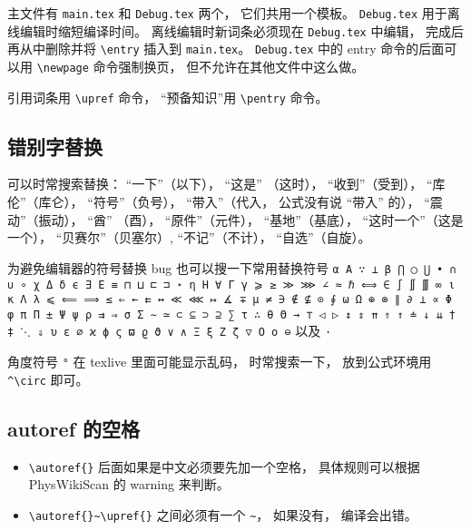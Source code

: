 主文件有 \verb|main.tex| 和 \verb|Debug.tex| 两个， 它们共用一个模板。 \verb|Debug.tex| 用于离线编辑时缩短编译时间。 离线编辑时新词条必须现在 \verb|Debug.tex| 中编辑， 完成后再从中删除并将 \verb|\entry| 插入到 \verb|main.tex|。 \verb|Debug.tex| 中的 entry 命令的后面可以用 \verb|\newpage| 命令强制换页， 但不允许在其他文件中这么做。

引用词条用 \verb|\upref| 命令， “预备知识”用 \verb|\pentry| 命令。

\subsection{错别字替换}
可以时常搜索替换： “一下”（以下）， “这是” （这时）， “收到”（受到）， “库伦”（库仑）， “符号”（负号）， “带入”（代入， 公式没有说 “带入” 的）， “震动”（振动）， “酋” （酉）， “原件”（元件）， “基地”（基底）， “这时一个”（这是一个）， “贝赛尔”（贝塞尔）, “不记”（不计）， “自选”（自旋）。

为避免编辑器的符号替换 bug 也可以搜一下常用替换符号 \verb|α Α ∵ ⊥ β ⋂ ◯ ⋃ • ∩ ∪ ∘ χ Δ δ ϵ ∃ Ε ≡ ⊓ ⊔ ⊏ ⊐ ⋆ η Η ∀ Γ γ ⩾ ≥ ≫ ⋙ ∠ ≈ ℏ ⟺ ∈ ∫ ∬ ∭ ∞ ι κ Λ λ ⩽ ⟸ ⟹ ≤ ⇐ ← ⇇ ↔ ≪ ⋘ ↦ ∡ ∓ μ ≠ ∋ ∉ ⊈ ⊙ ∮ ω Ω ⊕ ⊗ ∥ ∂ ⟂ ∝ Φ φ π Π ± Ψ ψ ρ ⇉ ⇒ σ Σ ∼ ≃ ⊂ ⊆ ⊃ ⊇ ∑ τ ∴ θ Θ → ⊤ ◁ ▷ ↕ ⇕ ⇈ ⇑ ↑ ≐ ↓ ⇊ † ‡ ⋱ ⇓ υ ε ∅ ϰ ϕ ς ϖ ϱ ϑ ∨ ∧ Ξ ξ Ζ ζ ▽ Ο ο ⊖| 以及 \verb|·|

角度符号 \verb|°| 在 texlive 里面可能显示乱码， 时常搜索一下， 放到公式环境用 \verb|^\circ| 即可。

\subsection{autoref 的空格}
\begin{itemize}
\item \verb|\autoref{}| 后面如果是中文必须要先加一个空格， 具体规则可以根据 PhysWikiScan 的 warning 来判断。
\item \verb|\autoref{}~\upref{}| 之间必须有一个 \verb|~|， 如果没有， 编译会出错。
\end{itemize}
